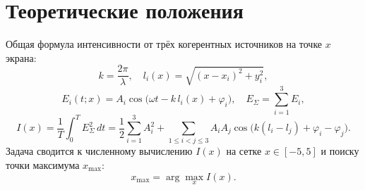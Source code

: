 \section{Теоретические положения}
Общая формула интенсивности от трёх когерентных источников на точке $x$ экрана:
\[
k = \frac{2\pi}{\lambda}, 
\quad
l_i(x) = \sqrt{(x - x_i)^2 + y_i^2},
\]
\[
E_i(t;x) = A_i\cos\!\bigl(\omega t - k\,l_i(x) + \varphi_i\bigr), 
\quad
E_\Sigma = \sum_{i=1}^3 E_i,
\]
\[
I(x) = \frac1T\int_0^T E_\Sigma^2\,dt
= \frac12\sum_{i=1}^3 A_i^2 
  + \sum_{1\le i<j\le3} A_iA_j\cos\!\bigl(k(l_i-l_j)+\varphi_i-\varphi_j\bigr).
\]
Задача сводится к численному вычислению $I(x)$ на сетке $x\in[-5,5]$ и поиску точки
максимума $x_{\max}$:
\[
x_{\max} = \arg\max_{x} I(x).
\]

